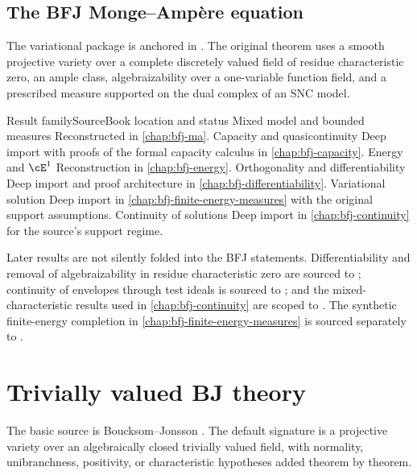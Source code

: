 \subsection{The BFJ Monge--Ampère equation}
\label{sec:appL-bfj-equation}

The variational package is anchored in \cite{BFJ15}.  The original theorem
uses a smooth projective variety over a complete discretely valued field of
residue characteristic zero, an ample class, algebraizability over a
one-variable function field, and a prescribed measure supported on the dual
complex of an SNC model.

\begin{AppLProvenanceLedger}{Result family}{Source}{Book location and status}
\AppLProvenanceRecord
  {Mixed model and bounded measures}
  {\cite[\S\S2--3]{BFJ15}}
  {Reconstructed in \cref{chap:bfj-ma}.}
\AppLProvenanceRecord
  {Capacity and quasicontinuity}
  {\cite[\S4]{BFJ15}}
  {Deep import with proofs of the formal capacity calculus in
   \cref{chap:bfj-capacity}.}
\AppLProvenanceRecord
  {Energy and \(\cE^1\)}
  {\cite[\S6]{BFJ15}}
  {Reconstruction in \cref{chap:bfj-energy}.}
\AppLProvenanceRecord
  {Orthogonality and differentiability}
  {\cite[Appendix~A and \S7]{BFJ15}}
  {Deep import and proof architecture in \cref{chap:bfj-differentiability}.}
\AppLProvenanceRecord
  {Variational solution}
  {\cite[\S\S7--8]{BFJ15}}
  {Deep import in \cref{chap:bfj-finite-energy-measures} with the original
   support assumptions.}
\AppLProvenanceRecord
  {Continuity of solutions}
  {\cite[\S8]{BFJ15}}
  {Deep import in \cref{chap:bfj-continuity} for the source's support regime.}
\end{AppLProvenanceLedger}

Later results are not silently folded into the BFJ statements.
Differentiability and removal of algebraizability in residue characteristic
zero are sourced to \cite{BGGJKM20}; continuity of envelopes through test
ideals is sourced to \cite{GJKM19}; and the mixed-characteristic results used
in \cref{chap:bfj-continuity} are scoped to \cite{FGK25}.  The synthetic
finite-energy completion in \cref{chap:bfj-finite-energy-measures} is sourced separately to
\cite{BJ25FiniteEnergy}.

\section{Trivially valued BJ theory}
\label{sec:appL-bj}

The basic source is Boucksom--Jonsson \cite{BJ22}.  The default signature is
a projective variety over an algebraically closed trivially valued field,
with normality, unibranchness, positivity, or characteristic hypotheses
added theorem by theorem.

